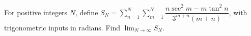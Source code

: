 For positive integers $N$, define $S_N=\displaystyle\sum_{n=1}^N\sum_{m=1}^N\dfrac{n\sec^2m-m\tan^2n}{3^{m+n}(m+n)}$, with trigonometric inputs in radians. Find $\lim_{N\to\infty}S_N$.
